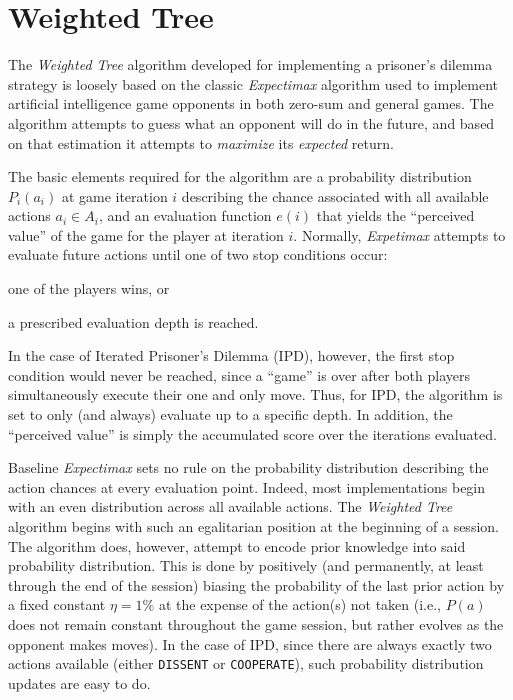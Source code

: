 \documentclass[10pt]{article}
\begin{document}
\lstset{
  basicstyle=\footnotesize\ttfamily
}

\section{Weighted Tree}
The \emph{Weighted Tree} algorithm developed for implementing a prisoner's dilemma strategy is loosely based on the classic \emph{Expectimax} algorithm used to implement artificial intelligence game opponents in both zero-sum and general games. The algorithm attempts to guess what an opponent will do in the future, and based on that estimation it attempts to \emph{maximize} its \emph{expected} return.\par

The basic elements required for the algorithm are a probability distribution $P_i(a_i)$ at game iteration $i$ describing the chance associated with all available actions $a_i \in A_i$, and an evaluation function $e(i)$ that yields the ``perceived value'' of the game for the player at iteration $i$. Normally, \emph{Expetimax} attempts to evaluate future actions until one of two stop conditions occur:
\begin{enumerate*}[(1)]
    \item one of the players wins, or
    \item a prescribed evaluation depth is reached.
\end{enumerate*}
In the case of Iterated Prisoner's Dilemma (IPD), however, the first stop condition would never be reached, since a ``game'' is over after both players simultaneously execute their one and only move. Thus, for IPD, the algorithm is set to only (and always) evaluate up to a specific depth. In addition, the ``perceived value'' is simply the accumulated score over the iterations evaluated.\par

Baseline \emph{Expectimax} sets no rule on the probability distribution describing the action chances at every evaluation point. Indeed, most implementations begin with an even distribution across all available actions. The \emph{Weighted Tree} algorithm begins with such an egalitarian position at the beginning of a session. The algorithm does, however, attempt to encode prior knowledge into said probability distribution. This is done by positively (and permanently, at least through the end of the session) biasing the probability of the last prior action by a fixed constant $\eta = 1\%$ at the expense of the action(s) not taken (i.e., $P(a)$ does not remain constant throughout the game session, but rather evolves as the opponent makes moves). In the case of IPD, since there are always exactly two actions available (either \texttt{DISSENT} or \texttt{COOPERATE}), such probability distribution updates are easy to do.\par
\end{document}
